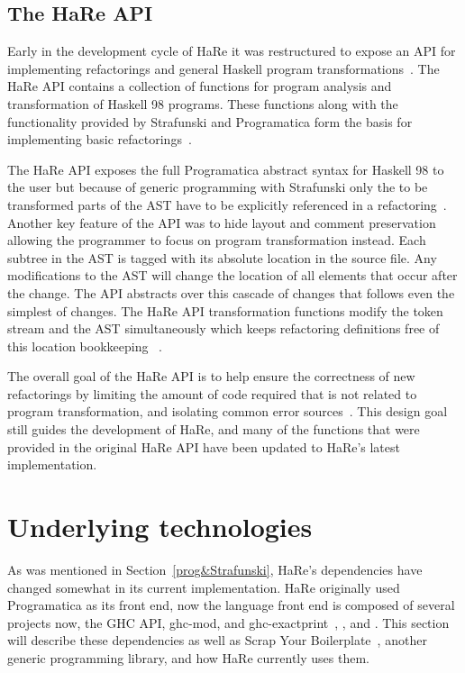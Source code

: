 \subsection{The HaRe API}\label{hareApi}

Early in the development cycle of HaRe it was restructured to expose an API for implementing refactorings and general Haskell program transformations~\citep{hareApi}. The HaRe API contains a collection of functions for program analysis and transformation of Haskell 98 programs. These functions along with the functionality provided by Strafunski and Programatica form the basis for implementing basic refactorings~\citep{hareApi}.

The HaRe API exposes the full Programatica abstract syntax for Haskell 98 to the user but because of generic programming with Strafunski only the to be transformed parts of the AST have to be explicitly referenced in a refactoring~\citep{hareApi}. Another key feature of the API was to hide layout and comment preservation allowing the programmer to focus on program transformation instead. Each subtree in the AST is tagged with its absolute location in the source file. Any modifications to the AST will change the location of all elements that occur after the change. The API abstracts over this cascade of changes that follows even the simplest of changes. The HaRe API transformation functions modify the token stream and the AST simultaneously which keeps refactoring definitions free of this location bookkeeping ~\citep{hareApi}. 

The overall goal of the HaRe API is to help ensure the correctness of new refactorings by limiting the amount of code required that is not related to program transformation, and isolating common error sources~\citep{hareApi}. This design goal still guides the development of HaRe, and many of the functions that were provided in the original HaRe API have been updated to HaRe's latest implementation. 
 
\section{Underlying technologies}

As was mentioned in Section~\ref{prog&Strafunski}, HaRe's dependencies have changed somewhat in its current implementation. HaRe originally used Programatica as its front end, now the language front end is composed of several projects now, the GHC API, ghc-mod, and ghc-exactprint~\citep{ghcApi}, \citep{ghcMod}, and \citep{exactprint}. This section will describe these dependencies as well as Scrap Your Boilerplate~\citep{syb}, another generic programming library, and how HaRe currently uses them.

